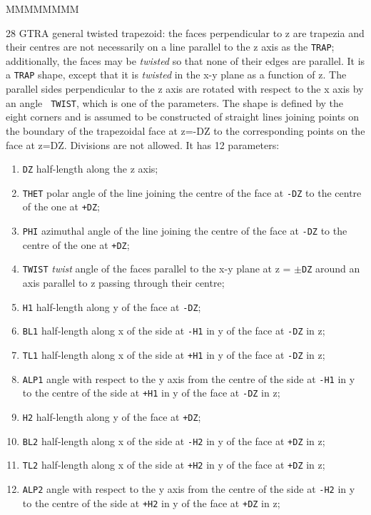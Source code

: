 \begin{DLtt}{MMMMMMMM}
\item[28  GTRA] general twisted trapezoid: the
faces perpendicular to z are trapezia and their centres are not necessarily
on a line parallel to the z axis as the {\tt TRAP}; additionally, the
faces may be {\it twisted} so that none of their edges are parallel. 
It is a {\tt TRAP} shape, except that it is {\it twisted}
in the x-y plane as a function of z. 
The parallel sides perpendicular to the z axis
are rotated with respect to the x axis by an angle {\tt
TWIST}, which is one of the parameters. The shape is defined by the eight
corners and is assumed to be constructed of straight lines joining points on
the boundary of the trapezoidal face at z=-DZ to the corresponding points on the
face at z=DZ. Divisions are not allowed.  It has 12 parameters: 
\begin{enumerate}
\item {\tt DZ} half-length along the z axis;
\item {\tt THET} polar angle of the line joining the centre of the
face at {\tt -DZ} to the centre of the one at {\tt +DZ};
\item {\tt PHI} azimuthal angle of the line joining the centre of the
face at {\tt -DZ} to the centre of the one at {\tt +DZ};
\item {\tt TWIST} {\it twist} angle of the faces parallel to the x-y plane
at z = $\pm${\tt DZ} around an axis parallel to z passing through their
centre;
\item {\tt H1} half-length along y of the face at {\tt -DZ};
\item {\tt BL1} half-length along x of the side at {\tt -H1}
in y of the face at {\tt -DZ} in z;
\item {\tt TL1} half-length along x of the side at {\tt +H1}
in y of the face at {\tt -DZ} in z;
\item {\tt ALP1} angle with respect to the y axis from the centre
of the side at {\tt -H1} in y to the centre 
of the side at {\tt +H1} in y of the face at {\tt -DZ} in z;
\item {\tt H2} half-length along y of the face at {\tt +DZ};
\item {\tt BL2} half-length along x of the side at {\tt -H2}
in y of the face at {\tt +DZ} in z;
\item {\tt TL2} half-length along x of the side at {\tt +H2}
in y of the face at {\tt +DZ} in z;
\item {\tt ALP2} angle with respect to the y axis from the centre
of the side at {\tt -H2} in y to the centre 
of the side at {\tt +H2} in y of the face at {\tt +DZ} in z;
\end{enumerate}


\end{DLtt}
